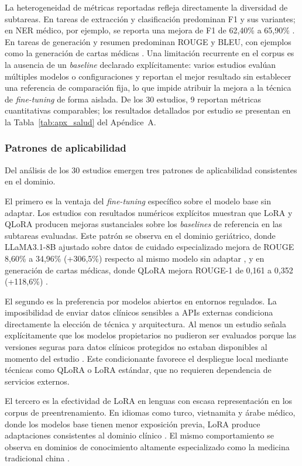 La heterogeneidad de métricas reportadas refleja directamente la diversidad de subtareas. En tareas de extracción y clasificación predominan F1 y sus variantes; en NER médico, por ejemplo, se reporta una mejora de F1 de 62,40\% a 65,90\% \parencite{zhou2024adapter}. En tareas de generación y resumen predominan ROUGE y BLEU, con ejemplos como la generación de cartas médicas \parencite{hou2024ft}. Una limitación recurrente en el corpus es la ausencia de un \textit{baseline} declarado explícitamente: varios estudios evalúan múltiples modelos o configuraciones y reportan el mejor resultado sin establecer una referencia de comparación fija, lo que impide atribuir la mejora a la técnica de \textit{fine-tuning} de forma aislada. De los 30 estudios, 9 reportan métricas cuantitativas comparables; los resultados detallados por estudio se presentan en la Tabla~\ref{tab:apx_salud} del Apéndice~A.

\subsubsection{Patrones de aplicabilidad}

Del análisis de los 30 estudios emergen tres patrones de aplicabilidad consistentes en el dominio.

El primero es la ventaja del \textit{fine-tuning} específico sobre el modelo base sin adaptar. Los estudios con resultados numéricos explícitos muestran que LoRA y QLoRA producen mejoras sustanciales sobre los \textit{baselines} de referencia en las subtareas evaluadas. Este patrón se observa en el dominio geriátrico, donde LLaMA3.1-8B ajustado sobre datos de cuidado especializado mejora de ROUGE 8,60\% a 34,96\% (+306,5\%) respecto al mismo modelo sin adaptar \parencite{xu2025cpel}, y en generación de cartas médicas, donde QLoRA mejora ROUGE-1 de 0,161 a 0,352 (+118,6\%) \parencite{hou2024ft}.

El segundo es la preferencia por modelos abiertos en entornos regulados. La imposibilidad de enviar datos clínicos sensibles a APIs externas condiciona directamente la elección de técnica y arquitectura. Al menos un estudio señala explícitamente que los modelos propietarios no pudieron ser evaluados porque las versiones seguras para datos clínicos protegidos no estaban disponibles al momento del estudio \parencite{chao2025evaluating}. Este condicionante favorece el despliegue local mediante técnicas como QLoRA o LoRA estándar, que no requieren dependencia de servicios externos.

El tercero es la efectividad de LoRA en lenguas con escasa representación en los corpus de preentrenamiento. En idiomas como turco, vietnamita y árabe médico, donde los modelos base tienen menor exposición previa, LoRA produce adaptaciones consistentes al dominio clínico \parencite{bayram2025medical, bui2025ft, khader2025ft}. El mismo comportamiento se observa en dominios de conocimiento altamente especializado como la medicina tradicional china \parencite{yang2024tcmgpt, tong2025xuanhugpt}.

